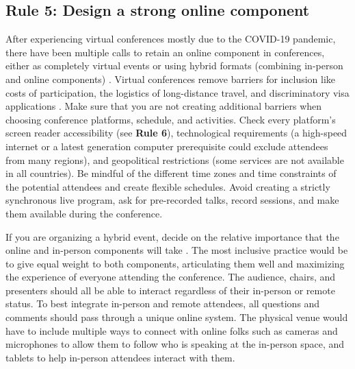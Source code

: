 \documentclass[10pt,letterpaper]{article}
\begin{document}
\subsection*{Rule 5: Design a strong online component} 
\label{rule_online}

After experiencing virtual conferences mostly due to the COVID-19 pandemic, there have been multiple calls to retain an online component in conferences, either as completely virtual events or using hybrid formats (combining in-person and online components) \cite{jooKeepOnlineOption2021, woolstonLearningLoveVirtual2020, ninerBetterWhomLeveling2021, roosOnlineConferencesNew2020, levitisCenteringInclusivityDesign2021, sarabipourChangingScientificMeetings2021}.
Virtual conferences remove barriers for inclusion like costs of participation, the logistics of long-distance travel, and discriminatory visa applications \cite{jooKeepOnlineOption2021, ninerBetterWhomLeveling2021, salibaGettingGripsOnline2020, gichoraTenSimpleRules2010a}. 
Make sure that you are not creating additional barriers when choosing conference platforms, schedule, and activities. 
Check every platform's screen reader accessibility (see \textbf{Rule 6}), technological requirements (a high-speed internet or a latest generation computer prerequisite could exclude attendees from many regions), and geopolitical restrictions (some services are not available in all countries).
Be mindful of the different time zones and time constraints of the potential attendees and create flexible schedules.
Avoid creating a strictly synchronous live program, ask for pre-recorded talks, record sessions, and make them available during the conference.

If you are organizing a hybrid event, decide on the relative importance that the online and in-person components will take \cite{bajpai_towards_2021}. The most inclusive practice would be to give equal weight to both components, articulating them well and maximizing the experience of everyone attending the conference.
The audience, chairs, and presenters should all be able to interact regardless of their in-person or remote status. 
To best integrate in-person and remote attendees, all questions and comments should pass through a unique online system. 
The physical venue would have to include multiple ways to connect with online folks such as cameras and microphones to allow them to follow who is speaking at the in-person space, and tablets to help in-person attendees interact with them.
\end{document}
